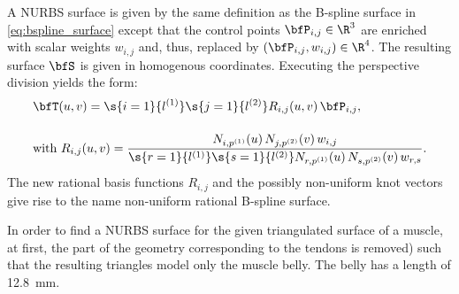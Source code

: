 A NURBS surface is given by the same definition as the B-spline surface in \cref{eq:bspline_surface} except that the control points $\bfP_{i,j} \in \R^3$ are enriched with scalar weights $w_{i,j}$ and, thus, replaced by $(\bfP_{i,j}, w_{i,j}) \in \R^4$. The resulting surface $\bfS$ is given in homogenous coordinates. Executing the perspective division yields the form:
%
\begin{align*}
  &\bfT(u,v) = \s{i=1}{l^{(1)}}\s{j=1}{l^{(2)}} R_{i,j}(u,v) \,\bfP_{i,j},\\[4mm]
  &\text{with } R_{i,j}(u,v) = \dfrac{N_{i,p^{(1)}}(u)\,N_{j,p^{(2)}}(v)\,w_{i,j}}{\s{r=1}{l^{(1)}}\s{s=1}{l^{(2)}} N_{r,p^{(1)}}(u)\,N_{s,p^{(2)}}(v)\,w_{r,s}}.
\end{align*}
The new rational basis functions $R_{i,j}$ and the possibly non-uniform knot vectors give rise to the name non-uniform rational B-spline surface.

In order to find a NURBS surface for the given triangulated surface of a muscle, at first, the part of the geometry corresponding to the tendons is removed) such that the resulting triangles model only the muscle belly. The belly has a length of \SI{12.8}{\mm}.

